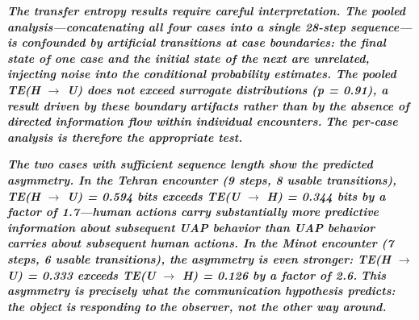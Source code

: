 \documentclass[11pt,letterpaper]{article}
\begin{document}
\begin{table}[H]
\centering
\small
{}
\caption*{\small\textit{Table 15. Transfer entropy results. Per-case analysis is preferred over pooled analysis due to concatenation boundary artifacts.}}
\end{table}


\textbf{\textit{The transfer entropy results require careful interpretation. The pooled analysis---concatenating all four cases into a single 28-step sequence---is confounded by artificial transitions at case boundaries: the final state of one case and the initial state of the next are unrelated, injecting noise into the conditional probability estimates. The pooled TE(H $\rightarrow$ U) does not exceed surrogate distributions (p = 0.91), a result driven by these boundary artifacts rather than by the absence of directed information flow within individual encounters. }}\textbf{\textit{The per-case analysis is therefore the appropriate test.}}


\textbf{\textit{The two cases with sufficient sequence length show the predicted asymmetry. In the Tehran encounter (9 steps, 8 usable transitions), TE(H $\rightarrow$ U) = 0.594 bits exceeds TE(U $\rightarrow$ H) = 0.344 bits by a factor of 1.7---human actions carry substantially more predictive information about subsequent UAP behavior than UAP behavior carries about subsequent human actions. In the Minot encounter (7 steps, 6 usable transitions), the asymmetry is even stronger: TE(H $\rightarrow$ U) = 0.333 exceeds TE(U $\rightarrow$ H) = 0.126 by a factor of 2.6. }}\textbf{\textit{This asymmetry is precisely what the communication hypothesis predicts: the object is }}\textbf{\textit{responding to}}\textbf{\textit{ the observer, not the other way around.}}
\end{document}
